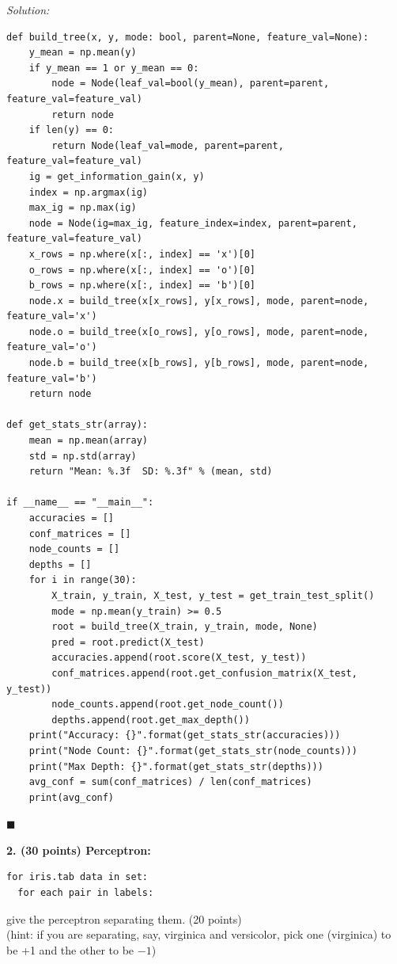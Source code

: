 \documentclass{article}
\newenvironment{problem}[2][]
    { \begin{mdframed}[backgroundcolor=gray!20] \textbf{#1#2} \\}
    {  \end{mdframed}}
\newenvironment{solution}
    {\textit{Solution:}\\}
    {$\blacksquare$}
\begin{document}
\begin{solution}
\begin{verbatim}
def build_tree(x, y, mode: bool, parent=None, feature_val=None):
    y_mean = np.mean(y)
    if y_mean == 1 or y_mean == 0:
        node = Node(leaf_val=bool(y_mean), parent=parent, feature_val=feature_val)
        return node
    if len(y) == 0:
        return Node(leaf_val=mode, parent=parent, feature_val=feature_val)
    ig = get_information_gain(x, y)
    index = np.argmax(ig)
    max_ig = np.max(ig)
    node = Node(ig=max_ig, feature_index=index, parent=parent, feature_val=feature_val)
    x_rows = np.where(x[:, index] == 'x')[0]
    o_rows = np.where(x[:, index] == 'o')[0]
    b_rows = np.where(x[:, index] == 'b')[0]
    node.x = build_tree(x[x_rows], y[x_rows], mode, parent=node, feature_val='x')
    node.o = build_tree(x[o_rows], y[o_rows], mode, parent=node, feature_val='o')
    node.b = build_tree(x[b_rows], y[b_rows], mode, parent=node, feature_val='b')
    return node

def get_stats_str(array):
    mean = np.mean(array)
    std = np.std(array)
    return "Mean: %.3f  SD: %.3f" % (mean, std)

if __name__ == "__main__":
    accuracies = []
    conf_matrices = []
    node_counts = []
    depths = []
    for i in range(30):
        X_train, y_train, X_test, y_test = get_train_test_split()
        mode = np.mean(y_train) >= 0.5
        root = build_tree(X_train, y_train, mode, None)
        pred = root.predict(X_test)
        accuracies.append(root.score(X_test, y_test))
        conf_matrices.append(root.get_confusion_matrix(X_test, y_test))
        node_counts.append(root.get_node_count())
        depths.append(root.get_max_depth())
    print("Accuracy: {}".format(get_stats_str(accuracies)))
    print("Node Count: {}".format(get_stats_str(node_counts)))
    print("Max Depth: {}".format(get_stats_str(depths)))
    avg_conf = sum(conf_matrices) / len(conf_matrices)
    print(avg_conf)
\end{verbatim}
\end{solution}

\begin{problem}{2. (30 points) Perceptron:}

\begin{verbatim}
for iris.tab data in set:
  for each pair in labels:
\end{verbatim}
  give the perceptron separating them. (20 points)\\
(hint: if you are separating, say, virginica and versicolor, 
pick one (virginica) to be +1 and the other to be $-1$)
\end{problem}
\end{document}
